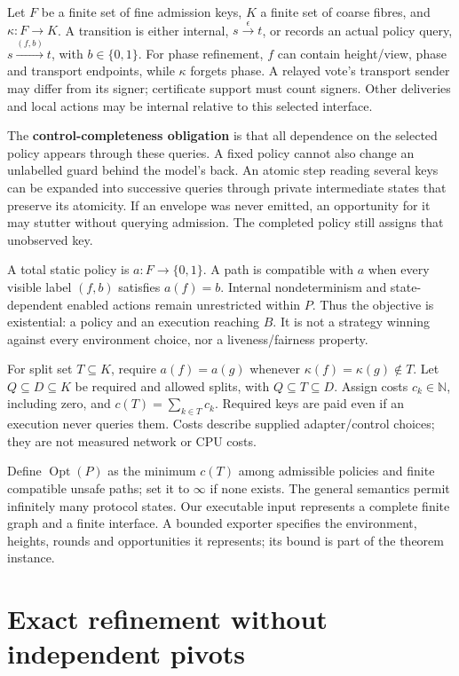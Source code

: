 Let \(F\) be a finite set of fine admission keys, \(K\) a finite set of
coarse fibres, and \(\kappa:F\to K\). A transition is either internal,
\(s\xrightarrow{\epsilon}t\), or records an actual policy query,
\(s\xrightarrow{(f,b)}t\), with \(b\in\{0,1\}\). For phase refinement,
\(f\) can contain height/view, phase and transport endpoints, while
\(\kappa\) forgets phase. A relayed vote's transport sender may differ
from its signer; certificate support must count signers. Other
deliveries and local actions may be internal relative to this selected
interface.

The \textbf{control-completeness obligation} is that all dependence on
the selected policy appears through these queries. A fixed policy cannot
also change an unlabelled guard behind the model's back. An atomic step
reading several keys can be expanded into successive queries through
private intermediate states that preserve its atomicity. If an envelope
was never emitted, an opportunity for it may stutter without querying
admission. The completed policy still assigns that unobserved key.

A total static policy is \(a:F\to\{0,1\}\). A path is compatible with
\(a\) when every visible label \((f,b)\) satisfies \(a(f)=b\). Internal
nondeterminism and state-dependent enabled actions remain unrestricted
within \(P\). Thus the objective is existential: a policy and an
execution reaching \(B\). It is not a strategy winning against every
environment choice, nor a liveness/fairness property.

For split set \(T\subseteq K\), require \(a(f)=a(g)\) whenever
\(\kappa(f)=\kappa(g)\notin T\). Let \(Q\subseteq D\subseteq K\) be
required and allowed splits, with \(Q\subseteq T\subseteq D\). Assign
costs \(c_k\in\mathbb N\), including zero, and
\(c(T)=\sum_{k\in T}c_k\). Required keys are paid even if an execution
never queries them. Costs describe supplied adapter/control choices;
they are not measured network or CPU costs.

Define \(\operatorname{Opt}(P)\) as the minimum \(c(T)\) among
admissible policies and finite compatible unsafe paths; set it to
\(\infty\) if none exists. The general semantics permit infinitely many
protocol states. Our executable input represents a complete finite graph
and a finite interface. A bounded exporter specifies the environment,
heights, rounds and opportunities it represents; its bound is part of
the theorem instance.

\section{Exact refinement without independent
pivots}\label{exact-refinement-without-independent-pivots}

